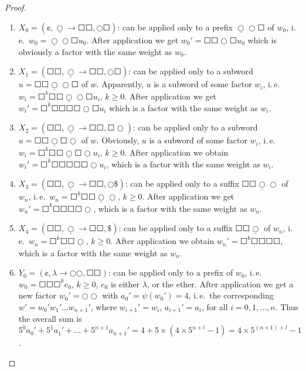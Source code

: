 \begin{proof}
\begin{enumerate}
\item $X_0 = (\cent, \underline{\Circle} \to \Square \Square, \Circle \Square)$: can be applied only to a prefix $\underline{\Circle} \Circle \Square$ of $w_0$, i.\,e.\ $w_0 = \underline{\Circle} \Circle \Square u_0$. After application we get $w_0' = \Square \Square \Circle \Square u_0$ which is obviously a factor with the same weight as $w_0$.
\item $X_1 = (\Square \Square, \underline{\Circle} \to \Square \Square, \Circle \Square)$: can be applied only to a subword $u = \Square \Square \underline{\Circle} \Circle \Square$ of $w$. Apparently, $u$ is a subword of some factor $w_i$, i.\,e.\ $w_i = \Square^k \Square \Square \underline{\Circle} \Circle \Square u_i$, $k \ge 0$. After application we get $w_i' = \Square^k \Square \Square \Square \Square \Circle \Square u_i$ which is a factor with the same weight as $w_i$.
\item $X_2 = (\Square \Square, \underline{\Circle} \to \Square \Square, \Square \Circle)$: can be applied only to a subword $u = \Square \Square \underline{\Circle} \Square \Circle$ of $w$. Obviously, $u$ is a subword of some factor $w_i$, i.\,e.\ $w_i = \Square^k \Square \Square \underline{\Circle} \Square \Circle u_i$, $k \ge 0$. After application we obtain $w_i' = \Square^k \Square \Square \Square \Square \Square \Circle u_i$, which is a factor with the same weight as $w_i$.
\item $X_3 = (\Square \Square, \underline{\Circle} \to \Square \Square, \Circle \$)$: can be applied only to a suffix $\Square \Square \underline{\Circle} \Circle$ of $w_n$, i.\,e.\ $w_n = \Square^k \Square \Square \underline{\Circle} \Circle$, $k \ge 0$. After application we get $w_n' = \Square^k \Square \Square \Square \Square \Circle$, which is a factor with the same weight as $w_n$.
\item $X_4 = (\Square \Square, \underline{\Circle} \to \Square \Square, \$)$: can be applied only to a suffix $\Square \Square \underline{\Circle}$ of $w_n$, i.\,e.\ $w_n = \Square^k \Square \Square \underline{\Circle}$, $k \ge 0$. After application we obtain $w_n' = \Square^k \Square \Square \Square \Square$, which is a factor with the same weight as $w_n$.
\item $Y_0 = (\cent, \lambda \to \Circle \Circle, \Square \Square)$: can be applied only to a prefix of $w_0$, i.\,e.\ $w_0 = \Square \Square \Square^k e_0$, $k \ge 0$, $e_0$ is either $\lambda$, or the ether. After application we get a new factor $w_0' = \Circle \Circle$ with $a_0' = \psi(w_0') = 4$, i.\,e.\ the corresponding $w' = w_0' w_1' \ldots w_{n+1}'$, where $w_{i+1}' = w_i$, $a_{i+1}' = a_i$, for all $i = 0, 1, \ldots, n$. Thus the overall sum is $5^0 a_0' + 5^1 a_1' + \ldots + 5^{n+1} a_{n+1}' = 4 + 5 \times (4 \times 5^{n+l} - 1) = 4 \times 5^{(n+1)+l} - 1$.

\end{enumerate}
\end{proof}

